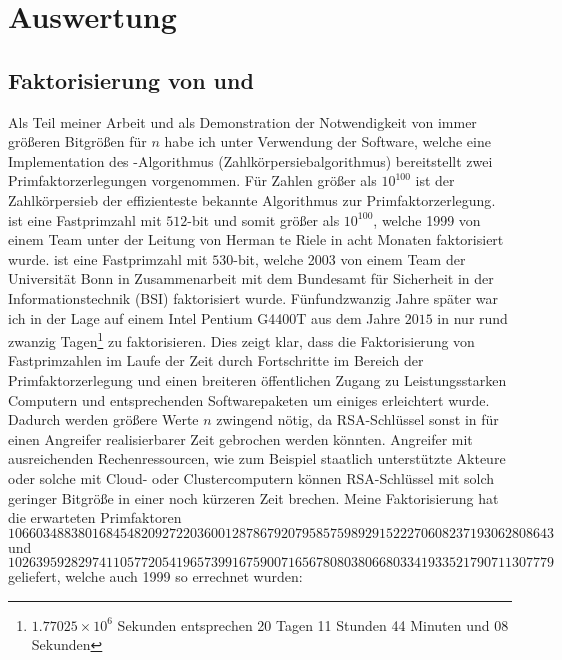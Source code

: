 \chapter{Auswertung}

\section{Faktorisierung von  und }

Als Teil meiner Arbeit und als Demonstration der Notwendigkeit von immer größeren Bitgrößen für $n$ habe ich unter Verwendung der  Software, welche eine Implementation des -Algorithmus (Zahlkörpersiebalgorithmus) bereitstellt zwei Primfaktorzerlegungen vorgenommen. Für Zahlen größer als $10^{100}$ ist der Zahlkörpersieb der effizienteste bekannte Algorithmus zur Primfaktorzerlegung\cite{SO2267146}.  ist eine Fastprimzahl mit $512$-bit und somit größer als $10^{100}$, welche 1999 von einem Team unter der Leitung von Herman te Riele in acht Monaten faktorisiert wurde\cite{rsa155}.  ist eine Fastprimzahl mit $530$-bit, welche 2003 von einem Team der Universität Bonn in Zusammenarbeit mit dem Bundesamt für Sicherheit in der Informationstechnik (BSI) faktorisiert wurde. Fünfundzwanzig Jahre später war ich in der Lage  auf einem Intel Pentium G4400T aus dem Jahre $2015$ in nur rund zwanzig Tagen\footnote{$1.77025 \times 10^{6}$ Sekunden entsprechen 20 Tagen 11 Stunden 44 Minuten und 08 Sekunden} zu faktorisieren. Dies zeigt klar, dass die Faktorisierung von Fastprimzahlen im Laufe der Zeit durch Fortschritte im Bereich der Primfaktorzerlegung und einen breiteren öffentlichen Zugang zu Leistungsstarken Computern und entsprechenden Softwarepaketen um einiges erleichtert wurde. Dadurch werden größere Werte $n$ zwingend nötig, da RSA-Schlüssel sonst in für einen Angreifer realisierbarer Zeit gebrochen werden könnten. Angreifer mit ausreichenden Rechenressourcen, wie zum Beispiel staatlich unterstützte Akteure oder solche mit Cloud- oder Clustercomputern können RSA-Schlüssel mit solch geringer Bitgröße in einer noch kürzeren Zeit brechen. Meine Faktorisierung hat die erwarteten Primfaktoren $106603488380168454820927220360012878679207958575989291522270608237193062808643$ und $102639592829741105772054196573991675900716567808038066803341933521790711307779$ geliefert, welche auch 1999 so errechnet wurden:

